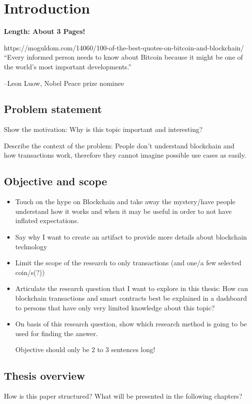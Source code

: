 \chapter{Introduction}
\label{chapter:Intro}

\textbf{Length: About 3 Pages!}

https://moguldom.com/14060/100-of-the-best-quotes-on-bitcoin-and-blockchain/
“Every informed person needs to know about Bitcoin because it might be one of the world’s most important developments.”

–Leon Luow, Nobel Peace prize nominee 
\section{Problem statement} \label{sec:Problem}


Show the motivation: Why is this topic important and interesting?

Describe the context of the problem: People don't understand blockchain and how transactions work, therefore they cannot imagine possible use cases as easily.

\section{Objective and scope} \label{sec:Objective}
\begin{itemize}
    \item Touch on the hype on Blockchain and take away the mystery/have people understand how it works and when it may be useful in order to not have inflated expectations.
    \item Say why I want to create an artifact to provide more details about blockchain technology
    \item Limit the scope of the research to only transactions (and one/a few selected coin/s(?))
    \item Articulate the research question that I want to explore in this thesis: How can blockchain transactions and smart contracts best be explained in a dashboard to persons that have only very limited knowledge about this topic?
    \item On basis of this research question, show which research method is going to be used for finding the answer.
    
    Objective should only be 2 to 3 sentences long!
    
\end{itemize}

\section{Thesis overview} \label{sec:ThesisOverview}
How is this paper structured? What will be presented in the following chapters?



